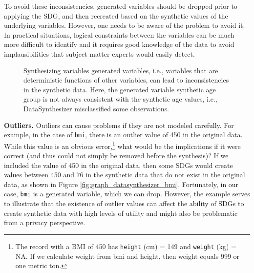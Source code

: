 \documentclass[runningheads]{llncs}
\begin{document}
To avoid these inconsistencies, generated variables should be dropped prior to applying the SDG, and then recreated based on the synthetic values of the underlying variables. However, one needs to be aware of the problem to avoid it. In practical situations, logical constraints between the variables can be much more difficult to identify and it requires good knowledge of the data to avoid implausibilities that subject matter experts would easily detect. 

\begin{figure}[t]
    \centering        
    \caption{Synthesizing variables generated variables, i.e., variables that are deterministic functions of other variables, can lead to inconsistencies in the synthetic data. Here, the generated variable synthetic age group is not always consistent with the synthetic age values, i.e., DataSynthesizer misclassified some observations. }\label{fig:graph_datasynthesizer_frequency_agegr_errors}
    \vspace{-2em}
\end{figure}

{\bf Outliers.} Outliers can cause problems if they are not modeled carefully. For example, in the case of \texttt{bmi}, there is an outlier value of 450 in the original data.  While this value is an obvious error,\footnote{The record with a BMI of 450 has \texttt{height} (cm) = 149 and \texttt{weight} (kg) = NA.  If we calculate weight from bmi and height, then weight equals 999 or one metric ton.} what would be the implications if it were correct (and thus could not simply be removed before the synthesis)?  If we included the value of 450 in the original data, then some SDGs would create values between 450 and 76 in the synthetic data that do not exist in the original data, as shown in Figure \ref{fig:graph_datasynthesizer_bmi}.  Fortunately, in our case, \texttt{bmi} is a generated variable, which we can drop.  However, the example serves to illustrate that the existence of outlier values can affect the ability of SDGs to create synthetic data with high levels of utility and might also be problematic from a privacy perspective.  
\end{document}

